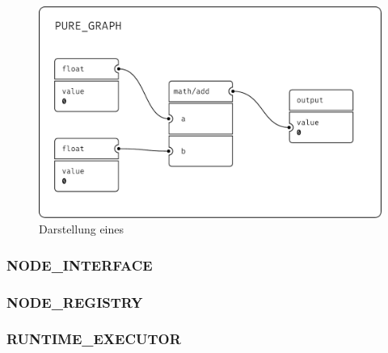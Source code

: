 \documentclass[ngerman]{article}
\begin{document}
\begin{figure}[htbp]
    \centering
    \begin{minipage}[b]{0.45\textwidth}
        \centering
        \includegraphics[width=\textwidth]{graphics/PURE_GRAPH.pdf}
        \caption{Darstellung eines }
        \label{sec:PURE_GRAPH}
    \end{minipage}
\end{figure}

\subsubsection{NODE\_INTERFACE}
\subsubsection{NODE\_REGISTRY}
\subsubsection{RUNTIME\_EXECUTOR}
\end{document}
